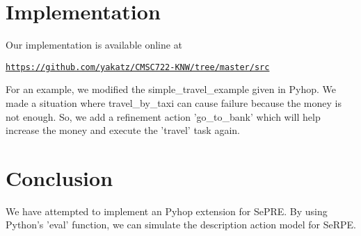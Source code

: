 \documentclass[11pt]{article} %
\begin{document}
\section{Implementation}

Our implementation is available online at
\begin{center}
\href{https://github.com/yakatz/CMSC722-KNW/tree/master/src}
{\tt https://github.com/yakatz/CMSC722-KNW/tree/master/src}
\end{center}

For an example, we modified the simple_travel_example given in Pyhop.
We made a situation where travel_by_taxi can cause failure because
the money is not enough. So, we add a refinement action 'go_to_bank'
which will help increase the money and execute the 'travel' task again.


\section{Conclusion}

We have attempted to implement an Pyhop extension for SePRE.
By using Python's 'eval' function, we can simulate the description 
action model for SeRPE.



\end{document}
